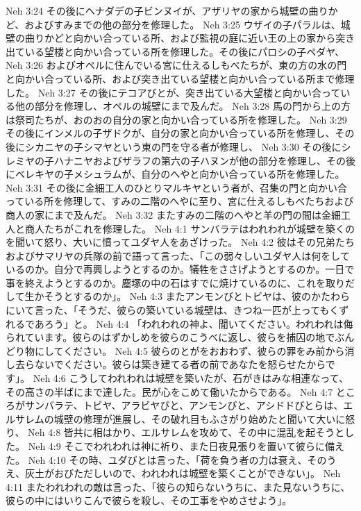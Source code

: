 Neh 3:24  その後にヘナダデの子ビンヌイが、アザリヤの家から城壁の曲りかど、およびすみまでの他の部分を修理した。
Neh 3:25  ウザイの子パラルは、城壁の曲りかどと向かい合っている所、および監視の庭に近い王の上の家から突き出ている望楼と向かい合っている所を修理した。その後にパロシの子ペダヤ、
Neh 3:26  およびオペルに住んでいる宮に仕えるしもべたちが、東の方の水の門と向かい合っている所、および突き出ている望楼と向かい合っている所まで修理した。
Neh 3:27  その後にテコアびとが、突き出ている大望楼と向かい合っている他の部分を修理し、オペルの城壁にまで及んだ。
Neh 3:28  馬の門から上の方は祭司たちが、おのおの自分の家と向かい合っている所を修理した。
Neh 3:29  その後にインメルの子ザドクが、自分の家と向かい合っている所を修理し、その後にシカニヤの子シマヤという東の門を守る者が修理し、
Neh 3:30  その後にシレミヤの子ハナニヤおよびザラフの第六の子ハヌンが他の部分を修理し、その後にベレキヤの子メシュラムが、自分のへやと向かい合っている所を修理した。
Neh 3:31  その後に金細工人のひとりマルキヤという者が、召集の門と向かい合っている所を修理して、すみの二階のへやに至り、宮に仕えるしもべたちおよび商人の家にまで及んだ。
Neh 3:32  またすみの二階のへやと羊の門の間は金細工人と商人たちがこれを修理した。
Neh 4:1  サンバラテはわれわれが城壁を築くのを聞いて怒り、大いに憤ってユダヤ人をあざけった。
Neh 4:2  彼はその兄弟たちおよびサマリヤの兵隊の前で語って言った、「この弱々しいユダヤ人は何をしているのか。自分で再興しようとするのか。犠牲をささげようとするのか。一日で事を終えようとするのか。塵塚の中の石はすでに焼けているのに、これを取りだして生かそうとするのか」。
Neh 4:3  またアンモンびとトビヤは、彼のかたわらにいて言った、「そうだ、彼らの築いている城壁は、きつね一匹が上ってもくずれるであろう」と。
Neh 4:4  「われわれの神よ、聞いてください。われわれは侮られています。彼らのはずかしめを彼らのこうべに返し、彼らを捕囚の地でぶんどり物にしてください。
Neh 4:5  彼らのとがをおおわず、彼らの罪をみ前から消し去らないでください。彼らは築き建てる者の前であなたを怒らせたからです」。
Neh 4:6  こうしてわれわれは城壁を築いたが、石がきはみな相連なって、その高さの半ばにまで達した。民が心をこめて働いたからである。
Neh 4:7  ところがサンバラテ、トビヤ、アラビヤびと、アンモンびと、アシドドびとらは、エルサレムの城壁の修理が進展し、その破れ目もふさがり始めたと聞いて大いに怒り、
Neh 4:8  皆共に相はかり、エルサレムを攻めて、その中に混乱を起そうとした。
Neh 4:9  そこでわれわれは神に祈り、また日夜見張りを置いて彼らに備えた。
Neh 4:10  その時、ユダびとは言った、「荷を負う者の力は衰え、そのうえ、灰土がおびただしいので、われわれは城壁を築くことができない」。
Neh 4:11  またわれわれの敵は言った、「彼らの知らないうちに、また見ないうちに、彼らの中にはいりこんで彼らを殺し、その工事をやめさせよう」。

